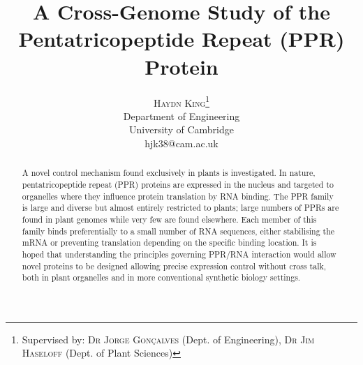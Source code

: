 \documentclass[twoside,a4paper]{article}
\title{\vspace{-15mm}\fontsize{24pt}{10pt}\selectfont\textbf{A Cross-Genome
Study of the Pentatricopeptide Repeat (PPR) Protein}} %
\author{
\large
\textsc{Haydn King}\thanks{Supervised by: \textsc{Dr Jorge Gon\c{c}alves} 
(Dept. of Engineering), \textsc{Dr Jim Haseloff} 
(Dept. of Plant Sciences)}\\[2mm] %
\normalsize Department of Engineering \\
\normalsize University of Cambridge \\ %
\normalsize hjk38@cam.ac.uk %
\vspace{-5mm}
}
\date{}
\begin{document}
\maketitle %

\thispagestyle{fancy} %


\begin{abstract}

\noindent A novel control mechanism found exclusively in plants is
investigated. 
In nature, pentatricopeptide repeat (PPR) proteins are expressed in the nucleus
and targeted to organelles where they influence protein translation by RNA
binding.
The PPR family is large and diverse but almost entirely restricted to plants; 
large numbers of PPRs are found in plant genomes while very few are found
elsewhere.
Each member of this family binds preferentially to a small number of RNA
sequences, either stabilising the mRNA or preventing translation depending on
the specific binding location.
It is hoped that understanding the principles governing PPR/RNA interaction would
allow novel proteins to be designed allowing precise expression control without
cross talk, both in plant organelles and in more conventional synthetic biology
settings.

\end{abstract}

\end{document}
